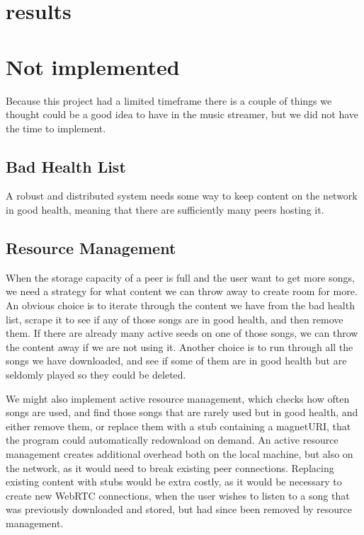 
\section{results}

\section{Not implemented}
Because this project had a limited timeframe there is a couple of things
we thought could be a good idea to have in the
music streamer, but we did not have the time to implement.

\subsection{Bad Health List}
A robust and distributed system needs some way to keep content on the network in good health,
meaning that there are sufficiently many peers hosting it.


\subsection{Resource Management}
When the storage capacity of a peer is full and the user want to get more songs,
we need a strategy for what content we can throw away to create room for more.
An obvious choice is to iterate through the content we have from the bad health list,
scrape it to see if any of those songs are in good health,
and then remove them.
If there are already many active seeds on one of those songs,
we can throw the content away if we are not using it.
Another choice is to run through all the songs we have downloaded,
and see if some of them are in good health but are seldomly played so they could be deleted.

We might also implement active resource management, which checks how often songs are used,
and find those songs that are rarely used but in good health, and either remove them,
or replace them with a stub containing a magnetURI, 
that the program could automatically redownload on demand.
An active resource management creates additional overhead both on the local machine,
but also on the network, as it would need to break existing peer connections.
Replacing existing content with stubs would be extra costly,
as it would be necessary to create new WebRTC connections,
when the user wishes to listen to a song that was previously downloaded and stored,
but had since been removed by resource management.

